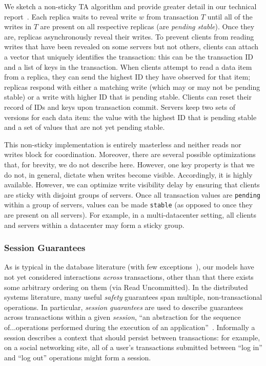 We sketch a non-sticky TA algorithm and provide greater detail in our
technical report~\cite{hat-tr}. Each replica waits to reveal write $w$
from transaction $T$ until all of the writes in $T$ are present on all
respective replicas (are \textit{pending stable}). Once they are,
replicas asynchronously reveal their writes. To prevent clients from
reading writes that have been revealed on some servers but not others,
clients can attach a vector that uniquely identifies the transaction:
this can be the transaction ID and a list of keys in the
transaction. When clients attempt to read a data item from a replica,
they can send the highest ID they have observed for that item;
replicas respond with either a matching write (which may or may not be
pending stable) or a write with higher ID that is pending
stable. Clients can reset their record of IDs and keys upon
transaction commit. Servers keep two sets of versions for each data
item: the value with the highest ID that is pending stable and a set
of values that are not yet pending stable.

This non-sticky implementation is entirely masterless and neither reads
nor writes block for coordination. Moreover, there are several
possible optimizations that, for brevity, we do not describe
here. However, one key property is that we do not, in general, dictate
when writes become visible. Accordingly, it is highly
available. However, we can optimize write visibility delay by ensuring
that clients are sticky with disjoint groups of servers. Once all
transaction values are \texttt{pending} within a group of servers,
values can be made \texttt{stable} (as opposed to once they are
present on all servers). For example, in a multi-datacenter setting,
all clients and servers within a datacenter may form a sticky group.


\subsubsection{Session Guarantees}

As is typical in the database literature (with few
exceptions~\cite{daudjee-session}), our models have not yet considered
interactions \textit{across} transactions, other than that there
exists some arbitrary ordering on them (via Read Uncommitted). In the
distributed systems literature, many useful \textit{safety} guarantees
span multiple, non-transactional operations. In particular,
\textit{session guarantees} are used to describe guarantees across
transactions within a given \textit{session}, ``an abstraction for the
sequence of...operations performed during the execution of an
application''~\cite{sessionguarantees}. Informally a session describes
a context that should persist between transactions: for example, on a
social networking site, all of a user's transactions submitted between
``log in'' and ``log out'' operations might form a session.


